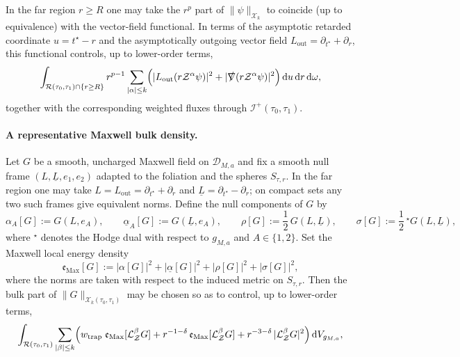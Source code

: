 \documentclass[11pt]{article}
\numberwithin{equation}{section}
\theoremstyle{plain}
\theoremstyle{definition}
\theoremstyle{remark}
\newcommand{\dd}{\mathrm{d}}
\begin{document}
In the far region $r\ge R$ one may take the $r^{p}$ part of $\|\psi\|_{\mathcal X_{k}}$ to coincide (up to equivalence) with the vector-field functional.
In terms of the asymptotic retarded coordinate $u=t^{\star}-r$ and the asymptotically outgoing vector field $L_{\mathrm{out}}=\partial_{t^{\star}}+\partial_{r}$, this functional controls, up to lower-order terms,
\begin{equation}\label{eq:kerr-rp-structural}
\int_{\mathcal R(\tau_{0},\tau_{1})\cap\{r\ge R\}} r^{p-1}\sum_{|\alpha|\le k}\Bigl(|L_{\mathrm{out}}(r\mathcal Z^{\alpha}\psi)|^{2}+|\slashed{\nabla}(r\mathcal Z^{\alpha}\psi)|^{2}\Bigr)\,\dd u\,\dd r\,\dd\omega,
\end{equation}
together with the corresponding weighted fluxes through $\mathcal I^{+}(\tau_{0},\tau_{1})$.
\paragraph{A representative Maxwell bulk density.}
Let $G$ be a smooth, uncharged Maxwell field on $\mathcal D_{M,a}$ and fix a smooth null frame $(L,\underline L,e_1,e_2)$ adapted to the foliation and the spheres $S_{\tau,r}$.
In the far region one may take $L=L_{\mathrm{out}}=\partial_{t^{\star}}+\partial_{r}$ and $\underline L=\partial_{t^{\star}}-\partial_{r}$; on compact sets any two such frames give equivalent norms.
Define the null components of $G$ by
\begin{equation}
\alpha_{A}[G]:=G(L,e_{A}),\qquad
\underline{\alpha}_{A}[G]:=G(\underline L,e_{A}),\qquad
\rho[G]:=\frac12\,G(L,\underline L),\qquad
\sigma[G]:=\frac12\,{}^{\star}G(L,\underline L),
\end{equation}
where ${}^{\star}$ denotes the Hodge dual with respect to $g_{M,a}$ and $A\in\{1,2\}$.
Set the Maxwell local energy density
\begin{equation}
\mathfrak e_{\mathrm{Max}}[G]
:=
|\alpha[G]|^{2}
+
|\underline{\alpha}[G]|^{2}
+
|\rho[G]|^{2}
+
|\sigma[G]|^{2},
\end{equation}
where the norms are taken with respect to the induced metric on $S_{\tau,r}$.
Then the bulk part of $\|G\|_{\mathcal X_{k}(\tau_{0},\tau_{1})}$ may be chosen so as to control, up to lower-order terms,
\begin{equation}\label{eq:kerr-maxwell-morawetz-structural}
\int_{\mathcal R(\tau_{0},\tau_{1})}\sum_{|\beta|\le k}\Bigl(
w_{\mathrm{trap}}\;\mathfrak e_{\mathrm{Max}}[\mathcal L_{\mathcal Z}^{\beta}G]
+r^{-1-\delta}\,\mathfrak e_{\mathrm{Max}}[\mathcal L_{\mathcal Z}^{\beta}G]
+r^{-3-\delta}\,|\mathcal L_{\mathcal Z}^{\beta}G|^{2}
\Bigr)\,\dd V_{g_{M,a}},
\end{equation}
\end{document}
